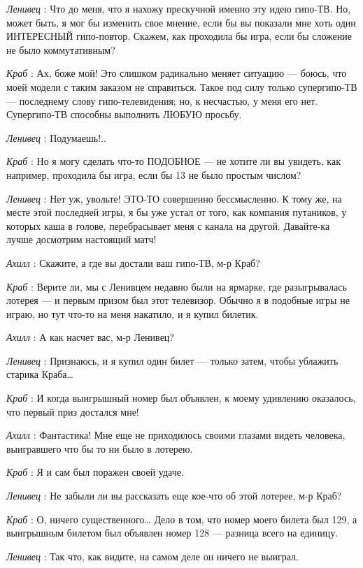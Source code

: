 \emph{Ленивец} : Что до меня, что я нахожу прескучной именно эту идею гипо-ТВ. Но, может быть, я мог бы изменить свое мнение, если бы вы показали мне хоть один ИНТЕРЕСНЫЙ гипо-повтор. Скажем, как проходила бы игра, если бы сложение не было коммутативным?

\emph{Краб} : Ах, боже мой! Это слишком радикально меняет ситуацию --- боюсь, что моей модели с таким заказом не справиться. Такое под силу только супергипо-ТВ --- последнему слову гипо-телевидения; но, к несчастью, у меня его нет. Супергипо-ТВ способны выполнить ЛЮБУЮ просьбу.

\emph{Ленивец} : Подумаешь!..

\emph{Краб} : Но я могу сделать что-то ПОДОБНОЕ --- не хотите ли вы увидеть, как например, проходила бы игра, если бы 13 не было простым числом?

\emph{Ленивец} : Нет уж, увольте! ЭТО-ТО совершенно бессмысленно. К тому же, на месте этой последней игры, я бы уже устал от того, как компания путаников, у которых каша в голове, перебрасывает меня с канала на другой. Давайте-ка лучше досмотрим настоящий матч!

\emph{Ахилл} : Скажите, а где вы достали ваш гипо-ТВ, м-р Краб?

\emph{Краб} : Верите ли, мы с Ленивцем недавно были на ярмарке, где разыгрывалась лотерея --- и первым призом был этот телевизор. Обычно я в подобные игры не играю, но тут что-то на меня накатило, и я купил билетик.

\emph{Ахилл} : А как насчет вас, м-р Ленивец?

\emph{Ленивец} : Признаюсь, и я купил один билет --- только затем, чтобы ублажить старика Краба\ldots{}

\emph{Краб} : И когда выигрышный номер был объявлен, к моему удивлению оказалось, что первый приз достался мне!

\emph{Ахилл} : Фантастика! Мне еще не приходилось своими глазами видеть человека, выигравшего что бы то ни было в лотерею.

\emph{Краб} : Я и сам был поражен своей удаче.

\emph{Ленивец} : Не забыли ли вы рассказать еще кое-что об этой лотерее, м-р Краб?

\emph{Краб} : О, ничего существенного\ldots{} Дело в том, что номер моего билета был 129, а выигрышным билетом был объявлен номер 128 --- разница всего на единицу.

\emph{Ленивец} : Так что, как видите, на самом деле он ничего не выиграл.

